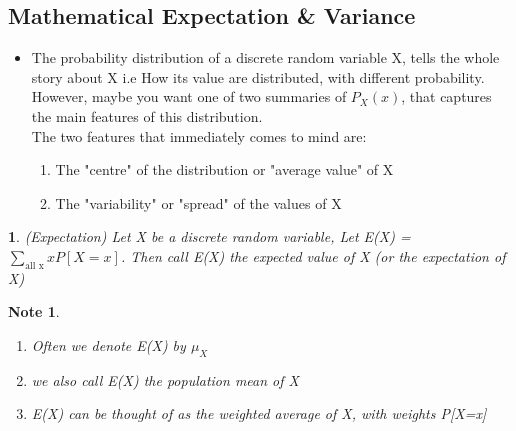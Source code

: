 \documentclass[11pt]{article}
\newtheorem*{note}{Note}
\newtheorem{definition}{\framebox{DEF}}[section]
\newcommand\tab[1][1cm]{\hspace*{#1}}
\begin{document}
        \subsection{Mathematical Expectation \& Variance}
            \begin{itemize}
                \item[\textbf{\framebox{Idea:}}] The probability distribution of a discrete random variable X, tells the whole story about X 
                                                    i.e How its value are distributed, with different probability. \\
                                                    However, maybe you want one of two summaries of $P_X(x)$, that captures the main features of this distribution.\\
                                                    The two features that immediately comes to mind are: 
                                                    \begin{enumerate}
                                                        \item The "centre" of the distribution or "average value" of X
                                                        \item The "variability" or "spread" of the values of X
                                                    \end{enumerate}
            \end{itemize}
            \begin{definition}(Expectation)
                Let X be a discrete random variable, Let E(X) = $\sum\limits_{\text{all x}} x P[X=x]$. 
                Then call E(X) the expected value of X (or the expectation of X)  
            \end{definition}
            \begin{note}\tab 
                \begin{enumerate}
                    \item Often we denote E(X) by $\mu_X$
                    \item we also call E(X) the population mean of X
                    \item E(X) can be thought of as the weighted average of X, with weights P[X=x]
                \end{enumerate}
            \end{note}
\end{document}
